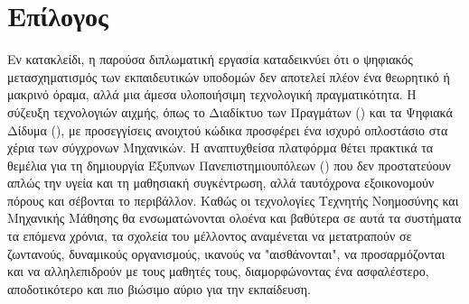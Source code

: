 \section{Επίλογος}
Εν κατακλείδι, η παρούσα διπλωματική εργασία καταδεικνύει ότι ο ψηφιακός μετασχηματισμός των εκπαιδευτικών υποδομών δεν αποτελεί πλέον ένα θεωρητικό ή μακρινό όραμα, αλλά μια άμεσα υλοποιήσιμη τεχνολογική πραγματικότητα. Η σύζευξη τεχνολογιών αιχμής, όπως το Διαδίκτυο των Πραγμάτων () και τα Ψηφιακά Δίδυμα (), με προσεγγίσεις ανοιχτού κώδικα προσφέρει ένα ισχυρό οπλοστάσιο στα χέρια των σύγχρονων Μηχανικών. Η αναπτυχθείσα πλατφόρμα θέτει πρακτικά τα θεμέλια για τη δημιουργία Έξυπνων Πανεπιστημιουπόλεων () που δεν προστατεύουν απλώς την υγεία και τη μαθησιακή συγκέντρωση, αλλά ταυτόχρονα εξοικονομούν πόρους και σέβονται το περιβάλλον. Καθώς οι τεχνολογίες Τεχνητής Νοημοσύνης και Μηχανικής Μάθησης θα ενσωματώνονται ολοένα και βαθύτερα σε αυτά τα συστήματα τα επόμενα χρόνια, τα σχολεία του μέλλοντος αναμένεται να μετατραπούν σε ζωντανούς, δυναμικούς οργανισμούς, ικανούς να "αισθάνονται", να προσαρμόζονται και να αλληλεπιδρούν με τους μαθητές τους, διαμορφώνοντας ένα ασφαλέστερο, αποδοτικότερο και πιο βιώσιμο αύριο για την εκπαίδευση.
